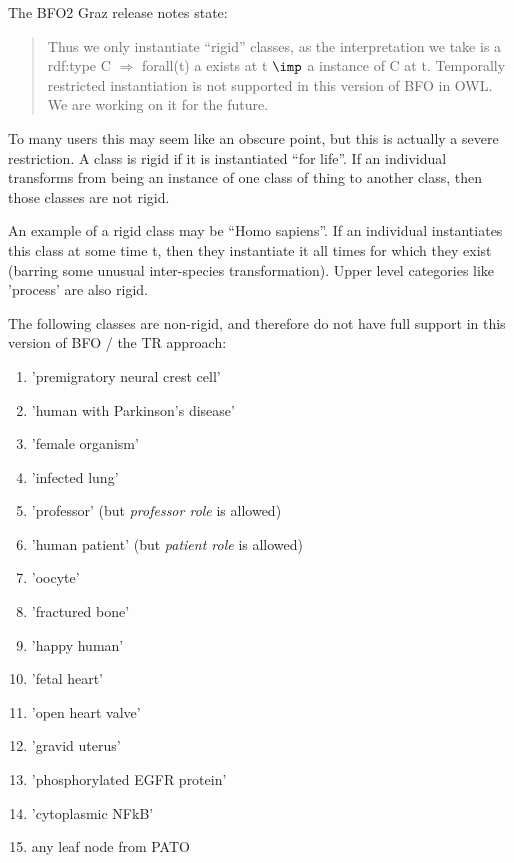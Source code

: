 \documentclass{bioinfo}
\begin{document}
The BFO2 Graz release notes\cite{Graz} state:

\begin{quotation}

  Thus we only instantiate ``rigid'' classes, as the interpretation we
  take is a rdf:type C $\Rightarrow$ forall(t) a exists at t $\imp$ a
  instance of C at t. Temporally restricted instantiation is not
  supported in this version of BFO in OWL. We are working on it for
  the future.

\end{quotation}

To many users this may seem like an obscure point, but this is
actually a severe restriction. A class is rigid if it is instantiated
``for life''. If an individual transforms from being an instance of
one class of thing to another class, then those classes are not rigid.

An example of a rigid class may be ``Homo sapiens''. If an individual
instantiates this class at some time t, then they instantiate it all
times for which they exist (barring some unusual inter-species
transformation). Upper level categories like 'process' are also rigid.

The following classes are non-rigid, and therefore do not have full
support in this version of BFO / the TR approach:

\begin{enumerate}

  \item 'premigratory neural crest cell'
  \item 'human with Parkinson's disease'
  \item 'female organism'
  \item 'infected lung'
  \item 'professor' (but \emph{professor role} is allowed)
  \item 'human patient' (but \emph{patient role} is allowed)
  \item 'oocyte'
  \item 'fractured bone'
  \item 'happy human'
  \item 'fetal heart'
  \item 'open heart valve'
  \item 'gravid uterus'
  \item 'phosphorylated EGFR protein'
  \item 'cytoplasmic NFkB'
  \item any leaf node from PATO

\end{enumerate}
\end{document}
